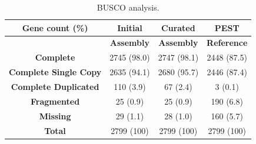\begin{table}[htbp!]
\caption{BUSCO analysis.}\label{table:busco}
\begin{tabular}{| c | c | c | c |}
\hline
 \textbf{Gene count (\%)} & \textbf{Initial} & \textbf{Curated} & \textbf{PEST} \\\hline
   & \textbf{Assembly} & \textbf{Assembly} & \textbf{Reference} \\\hline
 \textbf{Complete} & 2745 (98.0) & 2747 (98.1) & 2448 (87.5) \\\hline
  \textbf{Complete Single Copy} & 2635 (94.1) & 2680 (95.7) & 2446 (87.4)  \\\hline 
  \textbf{Complete Duplicated} & 110 (3.9) & 67 (2.4) & 3 (0.1) \\\hline 
  \textbf{Fragmented} & 25 (0.9) & 25 (0.9) & 190 (6.8) \\\hline 
  \textbf{Missing} & 29 (1.1) & 28 (1.0) & 160 (5.7) \\\hline 
   \textbf{Total} & 2799 (100) & 2799 (100) & 2799 (100) \\\hline
  
\end{tabular}
\end{table}




